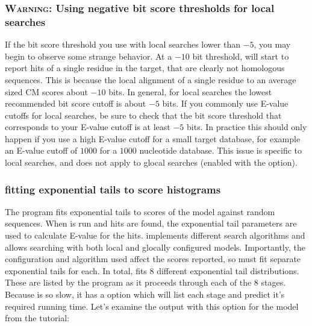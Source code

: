 \subsubsection{\textsc{Warning:} Using negative bit score thresholds for local searches}
If the bit score threshold you use with local searches lower than
 $-5$,  you may begin to observe some strange
behavior. At a $-10$ bit threshold,  will start to report
hits of a single residue in the target, that are clearly not
homologous sequences. This is because the local
alignment of a single residue to an average sized CM scores about $-10$
bits. In general, for local searches the lowest recommended bit score
cutoff is about $-5$ bits. If you commonly use
E-value cutoffs for local searches, be sure to check that the bit
score threshold that corresponds to your E-value cutoff is at least $-5$
bits. In practice this should only happen if you use a high E-value
cutoff for a small target database, for example an E-value cutoff of
$1000$ for a $1000$ nucleotide database. This issue is specific 
to local searches, and does not apply to glocal searches (enabled with the
  option). 

\subsubsection{fitting exponential tails to  score histograms}

The  program fits exponential tails to scores of the
model against random sequences. When  is run and hits
are found, the exponential tail parameters are used to calculate
E-value for the hits.  implements different search
algorithms and allows searching with both local and glocally
configured models. Importantly, the configuration and algorithm used
affect the scores reported, so  must fit separate
exponential tails for each.  In total,
 fits 8 different exponential tail
distributions. These are listed by the program as it proceeds through
each of the 8 stages.  Because  is so slow, it
has a  option which will list each stage and predict
it's required running time. Let's examine the output with this option
for the  model from the tutorial:

\\

